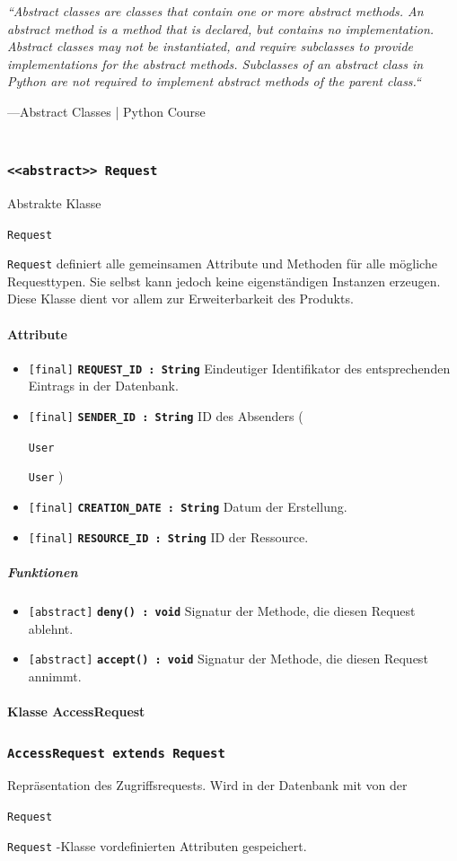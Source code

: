 \documentclass[parskip=full,11pt]{scrartcl}
\makeatletter
\newcommand{\lstInline}[2][,]{%
	\begingroup%
	\lstset{#1}%
	\begin{lrbox}{\mylisting}\lstinline!#2!\end{lrbox}%
	\setlength{\@tempdima}{\linegoal}%
	\ifdim\wd\mylisting>\@tempdima\hfill\\\fi%
	\lstinline!#2!%
	\endgroup%
}
\newcommand{\class}[1]{\subsubsection*{\lstinline[basicstyle=\ttfamily\large]{#1}}}
\newcommand{\atr}[4]{\lstinline{[#3]} \textbf{\lstinline{#1 : #2}} \newline #4}
\newcommand{\mtd}[5]{\lstinline{[#4]} \textbf{\lstinline{#1(#3) : #2}} \newline #5}
\newcommand{\inlinecode}[1]{\lstInline[breaklines=true]{#1}}
\makeatother
\begin{document}
      \begin{center}
    \textit{``Abstract classes are classes that contain one or more abstract methods. An abstract method is a method that is declared, but contains no implementation. Abstract classes may not be instantiated, and require subclasses to provide implementations for the abstract methods. Subclasses of an abstract class in Python are not required to implement abstract methods of the parent class.``}
    \end{center}
    —Abstract Classes | Python Course\\\\
    
 \class{<<abstract>> Request}
Abstrakte Klasse \inlinecode{Request} definiert alle gemeinsamen Attribute und Methoden für alle mögliche Requesttypen. Sie selbst kann jedoch keine eigenständigen Instanzen erzeugen. Diese Klasse dient vor allem zur Erweiterbarkeit des Produkts. 
 
\paragraph*{Attribute} %
\begin{itemize}
	\item \atr{REQUEST_ID}{String}{final}{
	Eindeutiger Identifikator des entsprechenden Eintrags in der Datenbank. 
	}
		\item \atr{SENDER_ID}{String}{final}{
	ID des Absenders (\inlinecode{User}) 
	}
		\item \atr{CREATION_DATE}{String}{final}{
	Datum der Erstellung. 
	}
		\item \atr{RESOURCE_ID}{String}{final}{
	ID der Ressource. 
	}
\end{itemize}
\subparagraph*{Funktionen}  %
\begin{itemize}
	\item \mtd{deny}{void}{}{abstract}{
	Signatur der Methode, die diesen Request ablehnt.
	}
	
	\item \mtd{accept}{void}{}{abstract}{
Signatur der Methode, die diesen Request annimmt.
	}
\end{itemize}
\newpage
  \paragraph*{Klasse AccessRequest}
 \class{AccessRequest extends Request}
Repräsentation des Zugriffsrequests. Wird in der Datenbank mit von der \inlinecode{Request}-Klasse vordefinierten Attributen gespeichert. 
 
\end{document}
